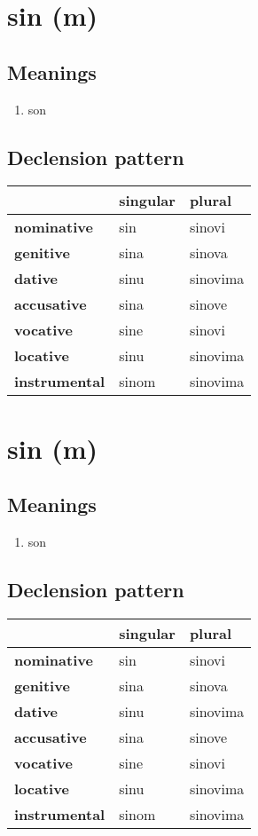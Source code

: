 \filbreak
\section{sin (m)}
\subsection*{Meanings}
\begin{enumerate}
\item son
\end{enumerate}
\subsection*{Declension pattern}
\begin{tabularx}{\linewidth}{Xll}
\toprule
{} & singular &    plural \\
\midrule
\textbf{nominative  } &      sin &    sinovi \\
\textbf{genitive    } &     sina &    sinova \\
\textbf{dative      } &     sinu &  sinovima \\
\textbf{accusative  } &     sina &    sinove \\
\textbf{vocative    } &     sine &    sinovi \\
\textbf{locative    } &     sinu &  sinovima \\
\textbf{instrumental} &    sinom &  sinovima \\
\bottomrule
\end{tabularx}

\filbreak
\section{sin (m)}
\subsection*{Meanings}
\begin{enumerate}
\item son
\end{enumerate}
\subsection*{Declension pattern}
\begin{tabularx}{\linewidth}{Xll}
\toprule
{} & singular &    plural \\
\midrule
\textbf{nominative  } &      sin &    sinovi \\
\textbf{genitive    } &     sina &    sinova \\
\textbf{dative      } &     sinu &  sinovima \\
\textbf{accusative  } &     sina &    sinove \\
\textbf{vocative    } &     sine &    sinovi \\
\textbf{locative    } &     sinu &  sinovima \\
\textbf{instrumental} &    sinom &  sinovima \\
\bottomrule
\end{tabularx}

